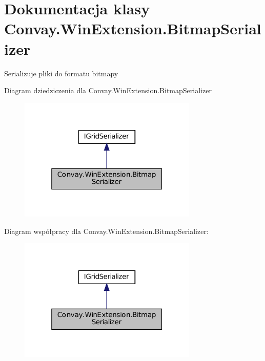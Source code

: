 \hypertarget{class_convay_1_1_win_extension_1_1_bitmap_serializer}{}\section{Dokumentacja klasy Convay.\+Win\+Extension.\+Bitmap\+Serializer}
\label{class_convay_1_1_win_extension_1_1_bitmap_serializer}


Serializuje pliki do formatu bitmapy  




Diagram dziedziczenia dla Convay.\+Win\+Extension.\+Bitmap\+Serializer
\nopagebreak
\begin{figure}[H]
\begin{center}
\leavevmode
\includegraphics[width=241pt]{class_convay_1_1_win_extension_1_1_bitmap_serializer__inherit__graph}
\end{center}
\end{figure}


Diagram współpracy dla Convay.\+Win\+Extension.\+Bitmap\+Serializer\+:
\nopagebreak
\begin{figure}[H]
\begin{center}
\leavevmode
\includegraphics[width=241pt]{class_convay_1_1_win_extension_1_1_bitmap_serializer__coll__graph}
\end{center}
\end{figure}
